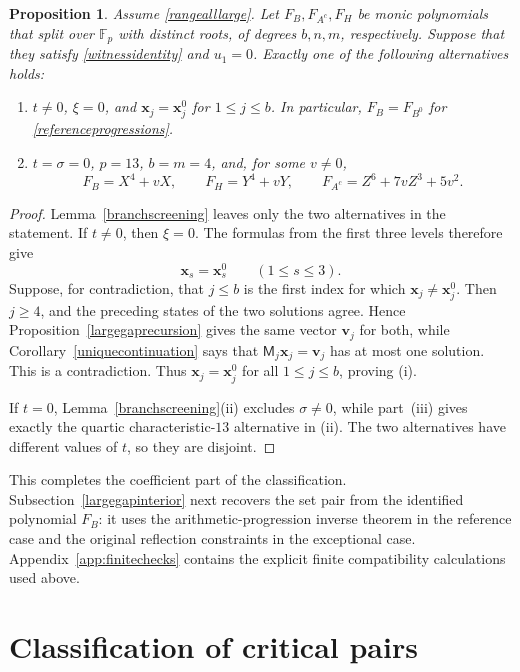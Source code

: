 \documentclass[12pt]{article}
\newtheorem{proposition}{Proposition}[section]
\theoremstyle{remark}
\newcommand{\F}{\mathbb{F}_p}
\begin{document}
\begin{proposition}\label{coefficientrigidity}
Assume \eqref{rangealllarge}.  Let $F_B,F_{A^c},F_H$ be monic
polynomials that split over $\F$ with distinct roots, of degrees
$b,n,m$, respectively.  Suppose that they satisfy
\eqref{witnessidentity} and $u_1=0$.  Exactly one of the following
alternatives holds:
\begin{enumerate}[label=\textup{(\roman*)},nosep]
\item $t\ne0$, $\xi=0$, and
$\mathbf x_j=\mathbf x_j^0$ for $1\le j\le b$.
In particular, $F_B=F_{B^0}$ for \eqref{referenceprogressions}.
\item $t=\sigma=0$, $p=13$, $b=m=4$, and, for some $v\ne0$,
\[
 F_B=X^4+vX,\qquad F_H=Y^4+vY,\qquad
 F_{A^c}=Z^6+7vZ^3+5v^2.
\]
\end{enumerate}
\end{proposition}
\begin{proof}
Lemma~\ref{branchscreening} leaves only the two alternatives in
the statement.  If $t\ne0$, then $\xi=0$.  The formulas from the first
three levels therefore give
\[
 \mathbf x_s=\mathbf x_s^0\qquad(1\le s\le3).
\]
Suppose, for contradiction, that $j\le b$ is the first index for which
$\mathbf x_j\ne\mathbf x_j^0$.  Then $j\ge4$, and the preceding states
of the two solutions agree.  Hence Proposition~\ref{largegaprecursion}
gives the same vector $\mathbf v_j$ for both, while
Corollary~\ref{uniquecontinuation} says that
$\mathsf M_j\mathbf x_j=\mathbf v_j$ has at most one solution.  This is
a contradiction.  Thus
$\mathbf x_j=\mathbf x_j^0$ for all $1\le j\le b$, proving
\textup{(i)}.

If $t=0$, Lemma~\ref{branchscreening}(ii) excludes
$\sigma\ne0$, while part~\textup{(iii)} gives exactly the quartic
characteristic-$13$ alternative in \textup{(ii)}.  The two alternatives
have different values of $t$, so they are disjoint.
\end{proof}

This completes the coefficient part of the classification.
Subsection~\ref{largegapinterior} next recovers the set pair from the
identified polynomial $F_B$: it uses the arithmetic-progression inverse
theorem in the reference case and the original reflection constraints
in the exceptional case.  Appendix~\ref{app:finitechecks} contains the explicit finite
compatibility calculations used above.

\section{Classification of critical pairs}\label{classification}
\end{document}
